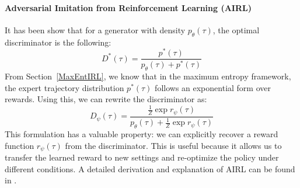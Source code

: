 \paragraph{Adversarial Imitation from Reinforcement Learning (AIRL)}
It has been show that for a generator with density $p_\theta(\tau)$, the optimal discriminator is the following:
$$D^*(\tau) = \frac{p^*(\tau)}{p_\theta(\tau)+p^*(\tau)}$$
From Section~\ref{MaxEntIRL}, we know that in the maximum entropy framework, the expert trajectory distribution $p^*(\tau)$ follows an 
exponential form over rewards. Using this, we can rewrite the discriminator as:
$$D_\psi(\tau) = \frac{\frac{1}{Z} \exp{r_\psi(\tau)}}{p_\theta(\tau)+\frac{1}{Z} \exp{r_\psi(\tau)}}$$
This formulation has a valuable property: we can explicitly recover a reward function $r_\psi(\tau)$ from the discriminator. This is useful 
because it allows us to transfer the learned reward to new settings and re-optimize the policy under different conditions. A detailed 
derivation and explanation of AIRL can be found in \cite{finn2016connectiongenerativeadversarialnetworks}.


